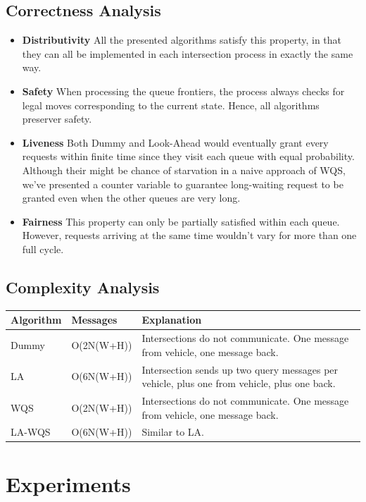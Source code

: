\documentclass[conference]{IEEEtran}
\begin{document}
\subsection{Correctness Analysis}

\begin{itemize}
\item {\bf Distributivity} All the presented algorithms satisfy this property, in that they can all be implemented in each intersection process in exactly the same way.
\item {\bf Safety} When processing the queue frontiers, the process always checks for legal moves corresponding to the current state. Hence, all algorithms preserver safety.
\item {\bf Liveness} Both Dummy and Look-Ahead would eventually grant every requests within finite time since they visit each queue with equal probability. Although their might be chance of starvation in a naive approach of WQS, we've presented a counter variable to guarantee long-waiting request to be granted even when the other queues are very long.
\item {\bf Fairness} This property can only be partially satisfied within each queue. However, requests arriving at the same time wouldn't vary for more than one full cycle.
\end{itemize}

\subsection{ Complexity Analysis}

\begin{table}[h]
	\center
	\begin{tabular}{ll p{4cm}}
	\hline
	Algorithm & Messages & Explanation\\
	\hline
	\hline
	Dummy & O(2N(W+H)) & Intersections do not communicate. One message from vehicle, one message back.\\
	\hline
	LA & O(6N(W+H)) & Intersection sends up two query messages per vehicle, plus one from vehicle, plus one back.\\
	\hline
	WQS & O(2N(W+H)) & Intersections do not communicate. One message from vehicle, one message back.\\
	\hline
	LA-WQS & O(6N(W+H)) & Similar to LA.\\
	\hline
	\end{tabular}
\end{table}

\section{Experiments}
\end{document}
